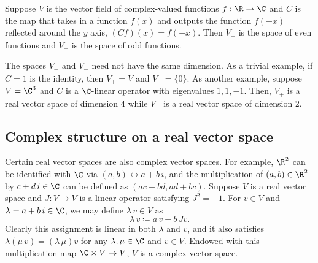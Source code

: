 
\begin{example}
Suppose $V$ is the vector field of complex-valued functions $f: \R \to \C$ and $C$ is the  map that takes in a function $f(x)$ and outputs the function $f(-x)$ reflected around the $y$ axis, $(C f)(x) = f(-x)$. Then $V_+$ is the space of even functions and $V_-$ is the space of odd functions.
\end{example}

\begin{remark}
The spaces $V_+$ and $V_-$ need not have the same dimension. As a trivial example, if $C = 1$ is the identity, then $V_+ = V$ and $V_- = \{0\}$. As another example, suppose $V = \C^3$ and $C$ is a $\C$-linear operator with eigenvalues $1, 1, -1$. Then, $V_+$ is a real vector space of dimension $4$ while $V_-$ is a real vector space of dimension $2$.
\end{remark}

\subsection{Complex structure on a real vector space} \label{subsec:complex_structure}
Certain real vector spaces are  also complex vector spaces. For example, $\R^2$ can be identified with $\C$ via $(a, b) \leftrightarrow a + b \, i$, and the multiplication of $(a, b) \in \R^2$ by $c + d \, i \in \C$ can be defined as $(a c - b d, a d + b c)$. Suppose $V$ is a real vector space and $J: V \to V$ is a linear operator satisfying $J^2 = -1$. For $v \in V$ and $\lambda = a + b \, i \in \C$, we may define $\lambda \, v \in V$ as
\begin{equation*}
    \lambda \, v \coloneqq a \, v + b \, J v.
\end{equation*}
Clearly this assignment is linear in both $\lambda$ and $v$, and it also satisfies $\lambda (\mu \, v) = (\lambda \, \mu) v$ for any $\lambda, \mu \in \C$ and $v \in V$. Endowed with this multiplication map $\C \times V \to V$, $V$ is a complex vector space.


